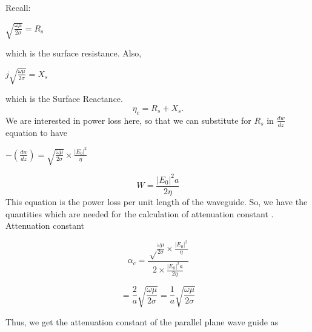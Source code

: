 Recall:
\begin{center}
$\sqrt{\frac{\omega\mu}{2\sigma}}=R_s$	
\end{center}
which is the surface resistance. Also,
\begin{center}
$j\sqrt{\frac{\omega\mu}{2\sigma}}=X_s$
\end{center}
which is the Surface Reactance.
\begin{equation}
\eta_c = R_s + X_s.
\end{equation}
We are interested in power loss here, so that we can substitute for $R_s$ in $\frac{dw}{dz}$ equation to have
\begin{center}
$-(\frac{dw}{dz})=\sqrt{\frac{\omega\mu}{2\sigma}}\times\frac{|E_0|^2}{\eta}$
\end{center}
\begin{equation}
W=\frac{|E_0|^2 a}{2\eta}
\end{equation}
This equation is the power loss per unit length of the waveguide. So, we have the quantities which are needed for the  calculation of attenuation constant .
Attenuation constant 
\begin{center}
$$\alpha_c = \frac{\sqrt\frac{\omega\mu}{2 \sigma}\times\frac{|E_0|^2}{\eta}}{2 \times \frac{|E_0|^2 a}{2 \eta}}$$

$$= \frac{2}{a}\sqrt{\frac{\omega\mu}{2\sigma}}=\frac{1}{a}\sqrt{\frac{\omega\mu}{2\sigma}}$$	
\end{center}
Thus, we get the attenuation constant of the parallel plane wave guide as

